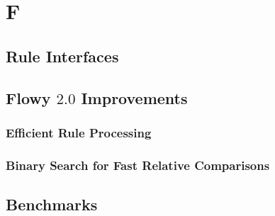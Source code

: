 \chapter{F}\label{ch:f}

\section{Rule Interfaces}\label{sec:rule-interfaces}

\section{Flowy $2.0$ Improvements}\label{sec:flowy-2-improvements}

\subsection{Efficient Rule Processing}\label{sec:rule-processing}
\subsection{Binary Search for
 						Fast Relative Comparisons}\label{sec:binary-search}

\section{Benchmarks}\label{sec:f-benchmarks}
